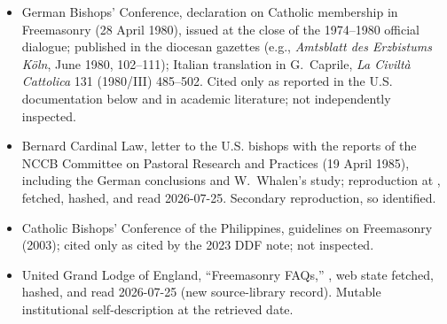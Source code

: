 {\fontsize{8.6}{9.6}\selectfont
\begin{itemize}[itemsep=0pt,parsep=0pt,topsep=0.05em]
\item German Bishops' Conference, declaration on Catholic membership in Freemasonry (28 April 1980), issued at the close of the 1974--1980 official dialogue; published in the diocesan gazettes (e.g., \emph{Amtsblatt des Erzbistums K\"oln}, June 1980, 102--111); Italian translation in G.~Caprile, \emph{La Civilt\`a Cattolica} 131 (1980/III) 485--502. Cited only as reported in the U.S. documentation below and in academic literature; not independently inspected.
\item Bernard Cardinal Law, letter to the U.S. bishops with the reports of the NCCB Committee on Pastoral Research and Practices (19 April 1985), including the German conclusions and W.~Whalen's study; reproduction at , fetched, hashed, and read 2026-07-25. Secondary reproduction, so identified.
\item Catholic Bishops' Conference of the Philippines, guidelines on Freemasonry (2003); cited only as cited by the 2023 DDF note; not inspected.
\item United Grand Lodge of England, ``Freemasonry FAQs,'' , web state fetched, hashed, and read 2026-07-25 (new source-library record). Mutable institutional self-description at the retrieved date.
\end{itemize}}

\endgroup
